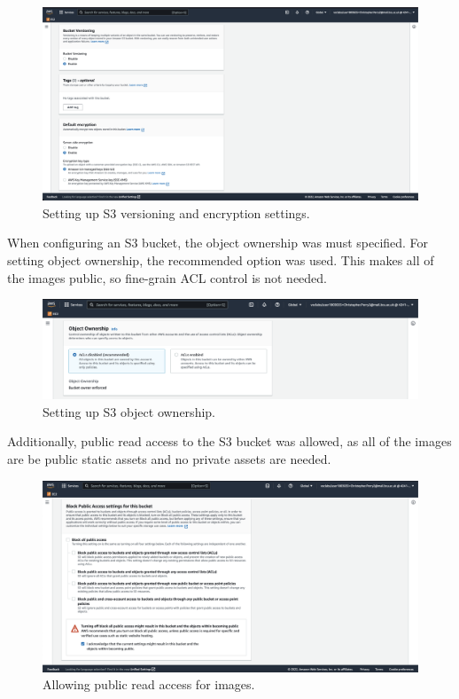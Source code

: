 \begin{figure}[!htbp]
    \centering
    \includegraphics[width=\textwidth]{resources/s3/s3-versioning-encrypting}
    \caption{Setting up S3 versioning and encryption settings.}
    \label{fig:s3-versioning-encrypting}
\end{figure}

\pagebreak
When configuring an S3 bucket, the object ownership was must specified.
For setting object ownership, the recommended option was used.
This makes all of the images public, so fine-grain ACL control is not needed.

\begin{figure}[!htbp]
    \centering
    \includegraphics[width=125mm]{resources/s3/s3-object-ownership}
    \caption{Setting up S3 object ownership.}
    \label{fig:s3-object-ownership}
\end{figure}

Additionally, public read access to the S3 bucket was allowed, as all of the images are be public static assets and no
private assets are needed.

\begin{figure}[!htbp]
    \centering
    \includegraphics[width=125mm]{resources/s3/s3-public-access}
    \caption{Allowing public read access for images.}
    \label{fig:s3-public-access}
\end{figure}

